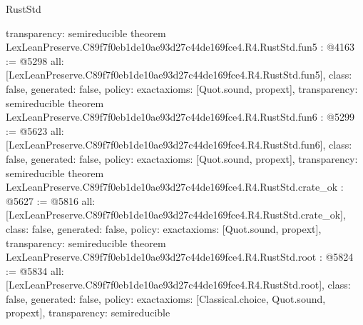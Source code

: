 \begin{lexlean}{RustStd}
\begin{coremodule}
{  transparency: semireducible
}
theorem LexLeanPreserve.C89f7f0eb1de10ae93d27c44de169fce4.R4.RustStd.fun5 : @4163 := @5298 {
  all: [LexLeanPreserve.C89f7f0eb1de10ae93d27c44de169fce4.R4.RustStd.fun5],
  class: false,
  generated: false,
  policy: exact{axioms: [Quot.sound, propext]},
  transparency: semireducible
}
theorem LexLeanPreserve.C89f7f0eb1de10ae93d27c44de169fce4.R4.RustStd.fun6 : @5299 := @5623 {
  all: [LexLeanPreserve.C89f7f0eb1de10ae93d27c44de169fce4.R4.RustStd.fun6],
  class: false,
  generated: false,
  policy: exact{axioms: [Quot.sound, propext]},
  transparency: semireducible
}
theorem LexLeanPreserve.C89f7f0eb1de10ae93d27c44de169fce4.R4.RustStd.crate_ok : @5627 := @5816 {
  all: [LexLeanPreserve.C89f7f0eb1de10ae93d27c44de169fce4.R4.RustStd.crate_ok],
  class: false,
  generated: false,
  policy: exact{axioms: [Quot.sound, propext]},
  transparency: semireducible
}
theorem LexLeanPreserve.C89f7f0eb1de10ae93d27c44de169fce4.R4.RustStd.root : @5824 := @5834 {
  all: [LexLeanPreserve.C89f7f0eb1de10ae93d27c44de169fce4.R4.RustStd.root],
  class: false,
  generated: false,
  policy: exact{axioms: [Classical.choice, Quot.sound, propext]},
  transparency: semireducible
}


\end{coremodule}
\end{lexlean}
